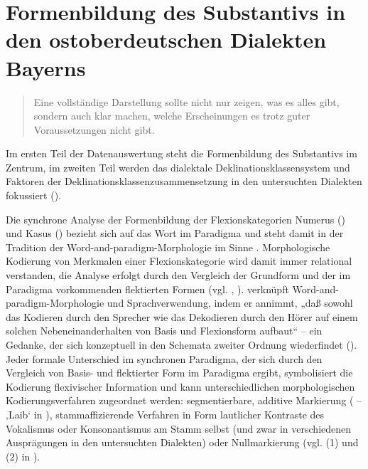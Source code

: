 \chapter{Formenbildung des Substantivs in den ostoberdeutschen Dialekten Bayerns}\label{chap:7}

\begin{quote}
Eine vollständige Darstellung sollte nicht nur zeigen, was es alles gibt, sondern auch klar machen, welche Erscheinungen es trotz guter Voraussetzungen nicht gibt.\hbox{}\hfill\hbox{\citep[348]{Rowley2004}}
\end{quote}

Im ersten Teil der Datenauswertung steht die Formenbildung des Substantivs im Zentrum, im zweiten Teil werden das dialektale De\-kli\-na\-tions\-klas\-sen\-sys\-tem und Faktoren der Deklinationsklassenzusammensetzung in den untersuchten Dialekten fokussiert ().

Die synchrone Analyse der Formenbildung der Flexionskategorien Numerus () und Kasus () bezieht sich auf das Wort im Paradigma und steht damit in der Tradition der Word-and-paradigm-Morphologie im Sinne . Morphologische Kodierung von Merkmalen einer Flexionskategorie wird damit immer relational verstanden, die Analyse erfolgt durch den Vergleich der Grundform und der im Paradigma vorkommenden flektierten Formen (vgl. \citealt[26--29]{Harnisch1987}, \citealt[23--25]{Rowley1997}). \citet[28]{Harnisch1987} verknüpft Word-and-paradigm-Morphologie und Sprachverwendung, indem er annimmt, „daß sowohl das Kodieren durch den Sprecher wie das Dekodieren durch den Hörer auf einem solchen Nebeneinanderhalten von Basis und Flexionsform aufbaut“ -- ein Gedanke, der sich konzeptuell in den Schemata zweiter Ordnung wiederfindet (). Jeder formale Unterschied im synchronen Paradigma, der sich durch den Vergleich von Basis- und flektierter Form im Paradigma ergibt, symbolisiert die Kodierung flexivischer Information und kann unterschiedlichen morphologischen Kodierungsverfahren zugeordnet werden: segmentierbare, additive Markierung ( --  ‚Laib‘ in ), stammaffizierende Verfahren in Form lautlicher Kontraste des Vokalismus oder Konsonantismus am Stamm selbst (und zwar in verschiedenen Ausprägungen in den untersuchten Dialekten) oder Nullmarkierung (vgl. (1) und (2) in ).


